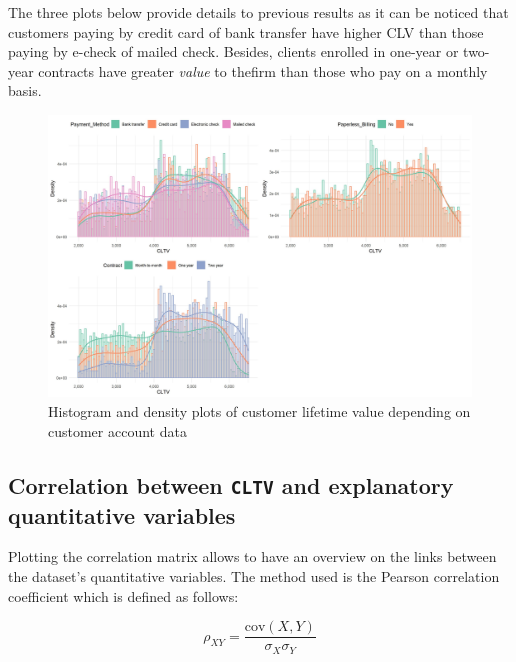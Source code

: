\documentclass[
]{book}
\begin{document}
The three plots below provide details to previous results as it can be noticed that customers paying by credit card of bank transfer have higher CLV than those paying by e-check of mailed check. Besides, clients enrolled in one-year or two-year contracts have greater \emph{value} to thefirm than those who pay on a monthly basis.

\begin{figure}

{\centering \includegraphics[width=50in]{./imgs/cltv_account_info_plots} 

}

\caption{Histogram and density plots of customer lifetime value depending on customer account data}\label{fig:cltvaccountinfo}
\end{figure}

\hypertarget{correlation-between-cltv-and-explanatory-quantitative-variables}{%
\subsection*{\texorpdfstring{Correlation between \texttt{CLTV} and explanatory quantitative variables}{Correlation between CLTV and explanatory quantitative variables}}\label{correlation-between-cltv-and-explanatory-quantitative-variables}}

Plotting the correlation matrix allows to have an overview on the links between the dataset's quantitative variables. The method used is the Pearson correlation coefficient which is defined as follows:

\begin{equation}
  \rho_{XY} = \frac{\text{cov}(X, Y)}{\sigma_X \sigma_Y}
  \label{eq:pearson}
\end{equation}
\end{document}
